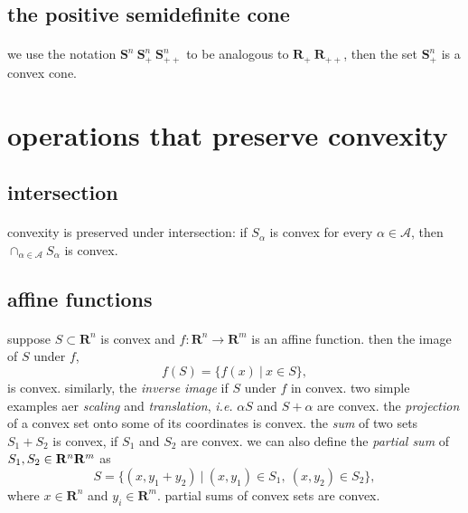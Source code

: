 \documentclass{article}
\begin{document}
  \subsection{the positive semidefinite cone}
    \paragraph{} we use the notation $\mathbf{S}^n\ \mathbf{S}_+^n\ \mathbf{S}_{++}^n$ to be analogous to $\mathbf{R}_+\ \mathbf{R}_{++}$, then the set $\mathbf{S}_+^n$ is a convex cone.
\section{operations that preserve convexity}
  \subsection{intersection}
    \paragraph{} convexity is preserved under intersection: if $S_\alpha$ is convex for every $\alpha \in \mathcal{A}$, then $\cap_{\alpha \in \mathcal{A}} S_\alpha$ is convex.
  \subsection{affine functions}
    \paragraph{} suppose $S \subset \mathbf{R}^n$ is convex and $f : \mathbf{R}^n \to \mathbf{R}^m$ is an affine function. then the image of $S$ under $f$,
    \begin{equation}
      f(S) = \{f(x)\ |\ x \in S\},
    \end{equation}
    is convex. similarly, the \textit{inverse image} if $S$ under $f$ in convex. two simple examples aer \textit{scaling} and \textit{translation}, \textit{i.e.} $\alpha S$ and $S + \alpha$ are convex. the \textit{projection} of a convex set onto some of its coordinates is convex. the \textit{sum} of two sets $S_1 + S_2$ is convex, if $S_1$ and $S_2$ are convex. we can also define the \textit{partial sum} of $S_1, S_2 \in \mathbf{R}^n \* \mathbf{R}^m$ as
    \begin{equation}
      S = \{(x, y_1 + y_2)\ |\ (x, y_1) \in S_1,\ (x, y_2) \in S_2\},
    \end{equation}
    where $x \in \mathbf{R}^n$ and $y_i \in \mathbf{R}^m$. partial sums of convex sets are convex.
\end{document}
